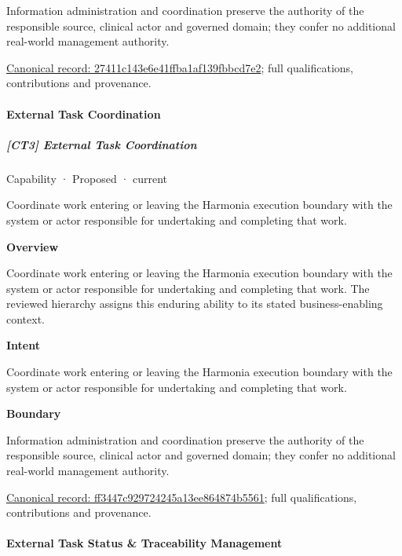 Information administration and coordination preserve the authority of the responsible source, clinical actor and governed domain; they confer no additional real-world management authority.


{\footnotesize \href{../../../../continuum/strategy/capability/27411c143e6e41ffba1af139fbbcd7e2.md}{Canonical record: 27411c143e6e41ffba1af139fbbcd7e2}; full qualifications, contributions and provenance.}\par
\paragraph{External Task Coordination}

\subparagraph{[CT3] External Task Coordination}

\label{element:ff3447c929724245a13ee864874b5561}
{\small Capability · Proposed · current}\par

Coordinate work entering or leaving the Harmonia execution boundary with the system or actor responsible for undertaking and completing that work.



\textbf{Overview}



Coordinate work entering or leaving the Harmonia execution boundary with the system or actor responsible for undertaking and completing that work. The reviewed hierarchy assigns this enduring ability to its stated business-enabling context.



\textbf{Intent}



Coordinate work entering or leaving the Harmonia execution boundary with the system or actor responsible for undertaking and completing that work.



\textbf{Boundary}



Information administration and coordination preserve the authority of the responsible source, clinical actor and governed domain; they confer no additional real-world management authority.


{\footnotesize \href{../../../../continuum/strategy/capability/ff3447c929724245a13ee864874b5561.md}{Canonical record: ff3447c929724245a13ee864874b5561}; full qualifications, contributions and provenance.}\par
\paragraph{External Task Status \& Traceability Management}

